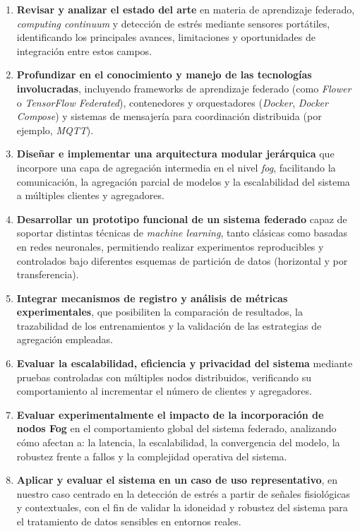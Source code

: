 \documentclass{report}
\begin{document}
\begin{enumerate}
    \item \textbf{Revisar y analizar el estado del arte} en materia de aprendizaje federado, \textit{computing continuum} y detección de estrés mediante sensores portátiles, identificando los principales avances, limitaciones y oportunidades de integración entre estos campos.
    
    \item \textbf{Profundizar en el conocimiento y manejo de las tecnologías involucradas}, incluyendo frameworks de aprendizaje federado (como \textit{Flower} o \textit{TensorFlow Federated}), contenedores y orquestadores (\textit{Docker}, \textit{Docker Compose}) y sistemas de mensajería para coordinación distribuida (por ejemplo, \textit{MQTT}).
    
    \item \textbf{Diseñar e implementar una arquitectura modular jerárquica} que incorpore una capa de agregación intermedia en el nivel \textit{fog}, facilitando la comunicación, la agregación parcial de modelos y la escalabilidad del sistema a múltiples clientes y agregadores.
    
    \item \textbf{Desarrollar un prototipo funcional de un sistema federado} capaz de soportar distintas técnicas de \textit{machine learning}, tanto clásicas como basadas en redes neuronales, permitiendo realizar experimentos reproducibles y controlados bajo diferentes esquemas de partición de datos (horizontal y por transferencia).
    
    \item \textbf{Integrar mecanismos de registro y análisis de métricas experimentales}, que posibiliten la comparación de resultados, la trazabilidad de los entrenamientos y la validación de las estrategias de agregación empleadas.
    
    \item \textbf{Evaluar la escalabilidad, eficiencia y privacidad del sistema} mediante pruebas controladas con múltiples nodos distribuidos, verificando su comportamiento al incrementar el número de clientes y agregadores.

    \item \textbf{Evaluar experimentalmente el impacto de la incorporación de nodos Fog} en el comportamiento global del sistema federado, analizando cómo afectan a: la latencia, la escalabilidad, la convergencia del modelo, la robustez frente a fallos y la complejidad operativa del sistema.
    
\item \textbf{Aplicar y evaluar el sistema en un caso de uso representativo}, en nuestro caso centrado en la detección de estrés a partir de señales fisiológicas y contextuales, con el fin de validar la idoneidad y robustez del sistema para el tratamiento de datos sensibles en entornos reales.

\end{enumerate}
\end{document}
